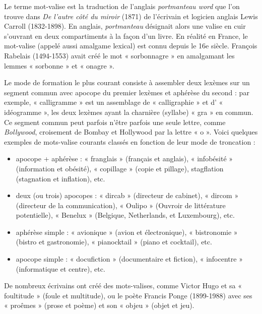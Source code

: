 Le terme mot-valise est la traduction de l’anglais \textit{portmanteau word} que l’on trouve dans \textit{De l’autre côté du miroir} (1871) de l’écrivain et logicien anglais Lewis Carroll (1832-1898). En anglais, \textit{portmanteau} désignait alors une valise en cuir s’ouvrant en deux compartiments à la façon d’un livre. En réalité en France, le mot-valise (appelé aussi amalgame lexical) est connu depuis le 16e siècle. François Rabelais (1494-1553) avait créé le mot « sorbonnagre » en amalgamant les lemmes « sorbonne » et « onagre ».

Le mode de formation le plus courant consiste à assembler deux lexèmes sur un segment commun avec apocope du premier lexèmes et aphérèse du second : par exemple, « calligramme » est un assemblage de « calligraphie » et d’ « idéogramme », les deux lexèmes ayant la charnière (syllabe) « gra » en commun. Ce segment commun peut parfois n’être parfois une seule lettre, comme \textit{Bollywood}, croisement de Bombay et Hollywood par la lettre « o ». Voici quelques exemples de mots-valise courants classés en fonction de leur mode de troncation :
\begin{itemize}
\item apocope + aphérèse : « franglais » (français et anglais), « infobésité » (information et obésité), « copillage » (copie et pillage), stagflation (stagnation et inflation), etc.
\item deux (ou trois) apocopes : « dircab » (directeur de cabinet), « dircom » (directeur de la communication), « Oulipo » (Ouvroir de littérature potentielle), « Benelux » (Belgique, Netherlands, et Luxembourg), etc.
\end{itemize}
\begin{itemize}
\item aphérèse simple : « avionique » (avion et électronique), « bistronomie » (bistro et gastronomie), « pianocktail » (piano et cocktail), etc.
\item apocope simple : « docufiction » (documentaire et fiction), « infocentre » (informatique et centre), etc.
\end{itemize}
De nombreux écrivains ont créé des mots-valises, comme Victor Hugo et sa « foultitude » (foule et multitude), ou le poète Francis Ponge (1899-1988) avec ses « proêmes » (prose et poème) et son « objeu » (objet et jeu).

